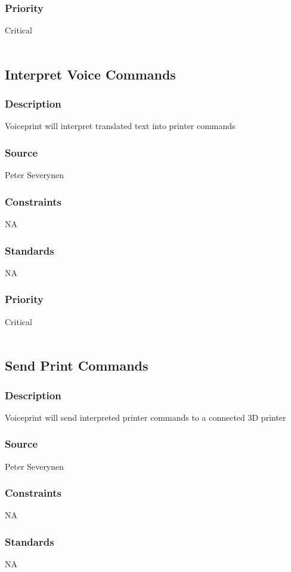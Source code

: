 \subsubsection{Priority}
Critical\\
\\
\subsection{Interpret Voice Commands}
\subsubsection{Description}
Voiceprint will interpret translated text into printer commands
\subsubsection{Source}
Peter Severynen
\subsubsection{Constraints}
NA
\subsubsection{Standards}
NA
\subsubsection{Priority}
Critical \\
\\
\subsection{Send Print Commands}
\subsubsection{Description}
Voiceprint will send interpreted printer commands to a connected 3D printer
\subsubsection{Source}
Peter Severynen
\subsubsection{Constraints}
NA
\subsubsection{Standards}
NA
